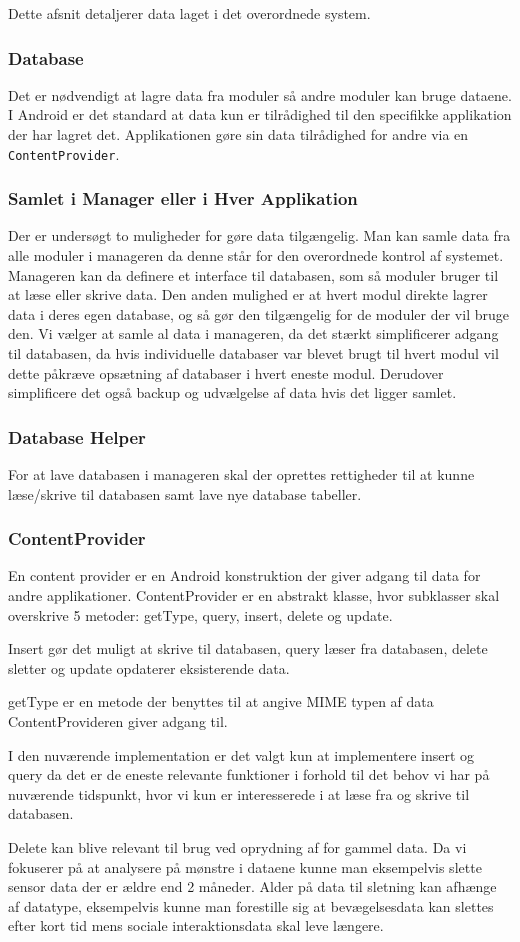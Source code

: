 Dette afsnit detaljerer data laget i det overordnede system. 

\subsubsection{Database}
Det er nødvendigt at lagre data fra moduler så andre moduler kan bruge dataene.
I Android er det standard at data kun er tilrådighed til den specifikke applikation der har lagret det.
Applikationen gøre sin data tilrådighed for andre via en \texttt{ContentProvider}.

\subsubsection{Samlet i Manager eller i Hver Applikation}
Der er undersøgt to muligheder for gøre data tilgængelig.
Man kan samle data fra alle moduler i manageren da denne står for den overordnede kontrol af systemet. 
Manageren kan da definere et interface til databasen, som så moduler bruger til at læse eller skrive data. 
Den anden mulighed er at hvert modul direkte lagrer data i deres egen database, og så gør den tilgængelig for de moduler der vil bruge den.
Vi vælger at samle al data i manageren, da det stærkt simplificerer adgang til databasen, da hvis individuelle databaser var blevet brugt til hvert modul vil dette påkræve opsætning af databaser i hvert eneste modul.
Derudover simplificere det også backup og udvælgelse af data hvis det ligger samlet.

\subsubsection{Database Helper}
For at lave databasen i manageren skal der oprettes rettigheder til at kunne læse/skrive til databasen samt lave nye database tabeller.

\subsubsection{ContentProvider}
En content provider er en Android konstruktion der giver adgang til data for andre applikationer.
ContentProvider er en abstrakt klasse, hvor subklasser skal overskrive 5 metoder:  getType, query, insert, delete og update. \cite{contentprovider}

Insert gør det muligt at skrive til databasen, query læser fra databasen, delete sletter og update opdaterer eksisterende data.

getType er en metode der benyttes til at angive MIME typen af data ContentProvideren giver adgang til.

I den nuværende implementation er det valgt kun at implementere insert og query da det er de eneste relevante funktioner i forhold til det behov vi har på nuværende tidspunkt, hvor vi kun er interesserede i at læse fra og skrive til databasen.

Delete kan blive relevant til brug ved oprydning af for gammel data. Da vi fokuserer på at analysere på mønstre i dataene kunne man eksempelvis slette sensor data der er ældre end 2 måneder. 
Alder på data til sletning kan afhænge af datatype, eksempelvis kunne man forestille sig at bevægelsesdata kan slettes efter kort tid mens sociale interaktionsdata skal leve længere.